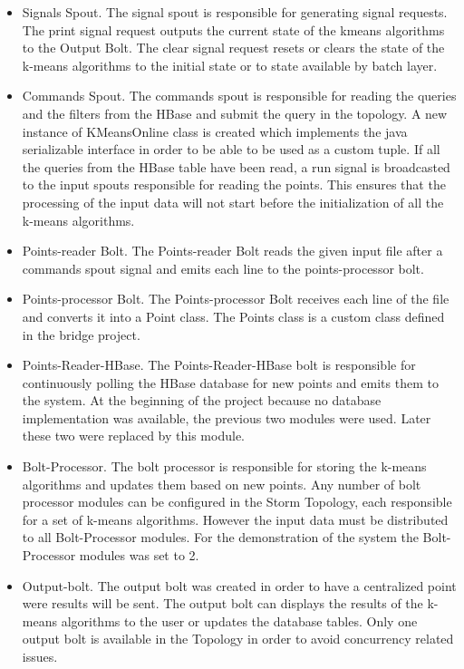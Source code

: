 \documentclass{lmproj}
\begin{document}
\begin{itemize}
	\item Signals Spout. The signal spout is responsible for generating signal requests. The print signal request outputs the current state of the kmeans algorithms to the Output Bolt. The clear signal request resets or clears the state of the k-means algorithms to the initial state or to state available by batch layer.
	\item Commands Spout. The commands spout is responsible for reading the queries and the filters from the HBase and submit the query in the topology. A new instance of KMeansOnline class is created which implements the java serializable interface in order to be able to be used as a custom tuple. If all the queries from the HBase table have been read, a run signal is broadcasted to the input spouts responsible for reading the points. This ensures that the processing of the input data will not start before the initialization of all the k-means algorithms. 
	\item Points-reader Bolt. The Points-reader Bolt reads the given input file after a commands spout signal and emits each line to the points-processor bolt.
	\item Points-processor Bolt. The Points-processor Bolt receives each line of the file and converts it into a Point class.  The Points class is a custom class defined in the bridge project.
	\item Points-Reader-HBase. The Points-Reader-HBase bolt is responsible for continuously polling the HBase database for new points and emits them to the system. At the beginning of the project because no database implementation was available, the previous two modules were used. Later these two were replaced by this module. 
	\item Bolt-Processor. The bolt processor is responsible for storing the k-means algorithms and updates them based on new points.  Any number of bolt processor modules can be configured in the Storm Topology, each responsible for a set of k-means algorithms. However the input data must be distributed to all Bolt-Processor modules. For the demonstration of the system the Bolt-Processor modules was set to 2.
	\item Output-bolt. The output bolt was created in order to have a centralized point were results will be sent. The output bolt can displays the results of the k-means algorithms to the user or updates the database tables. Only one output bolt is available in the Topology in order to avoid concurrency related issues.
	
\end{itemize}
\end{document}
